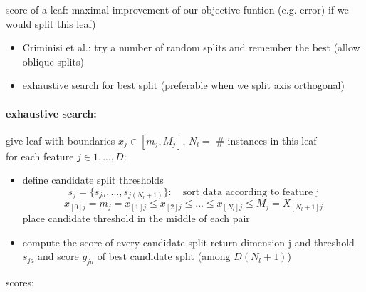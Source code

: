 \documentclass[11pt]{article}
\begin{document}
            score of a leaf: maximal improvement of our objective funtion (e.g. error) if we would split this leaf)
            \begin{itemize}
              \item Criminisi et al.: try a number of random splits and remember the best (allow oblique splits)
              \item exhaustive search for best split (preferable when we split axis orthogonal)
            \end{itemize}
            \paragraph{exhaustive search:} give leaf with boundaries $x_j \in [m_j, M_j]$, $N_l =$ # instances in this leaf \\
              for each feature $j \in 1,...,D$:
              \begin{itemize}
                \item define candidate split thresholds
                \begin{equation*}
                  s_j = \{ s_{ja},...,s_{j(N_l+1)} \}: \quad \text{sort data according to feature j}
                \end{equation*}
                \begin{equation*}
                  x_{[0]j} = m_j = x_{[1]j} \leq x_{[2]j} \leq ... \leq x_{[N_l]j} \leq M_j = X_{[N_l+1]j}
                \end{equation*}
                place candidate threshold in the middle of each pair
                \item compute the score of every candidate split
                return dimension j and threshold $s_{ja}$ and score $g_{ja}$ of best candidate split (among $D(N_l+1)$)
              \end{itemize}
              scores:
\end{document}

